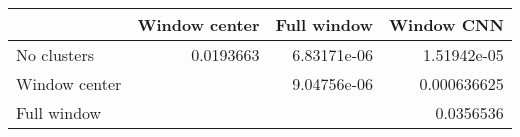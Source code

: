 \begin{tabular}{lrrr}
\toprule
               &      Window center &   Full window &    Window CNN \\
\midrule
 No clusters   &       0.0193663   &   6.83171e-06 &   1.51942e-05 \\
 Window center &       &   9.04756e-06 &   0.000636625 \\
 Full window   &       &            &   0.0356536   \\
\bottomrule
\end{tabular}
